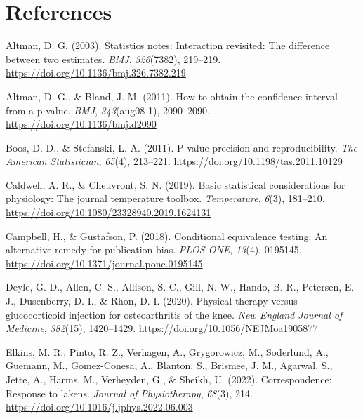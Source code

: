 \documentclass[]{cik}%
\newlength{\cslhangindent}
\newlength{\cslentryspacingunit} %
\newenvironment{CSLReferences}[2] %
 {%
  \setlength{\parindent}{0pt}
  \ifodd #1
  \let\oldpar\par
  \def\par{\hangindent=\cslhangindent\oldpar}
  \fi
  \setlength{\parskip}{#2\cslentryspacingunit}
 }%
 {}
\begin{document}
\newpage

\hypertarget{references}{%
\section*{References}\label{references}}

\hypertarget{refs}{}
\begin{CSLReferences}{1}{0}
\leavevmode{}%
Altman, D. G. (2003). Statistics notes: Interaction revisited: The
difference between two estimates. \emph{BMJ}, \emph{326}(7382),
219--219. \url{https://doi.org/10.1136/bmj.326.7382.219}

\leavevmode{}%
Altman, D. G., \& Bland, J. M. (2011). How to obtain the confidence
interval from a p value. \emph{BMJ}, \emph{343}(aug08 1), 2090--2090.
\url{https://doi.org/10.1136/bmj.d2090}

\leavevmode{}%
Boos, D. D., \& Stefanski, L. A. (2011). P-value precision and
reproducibility. \emph{The American Statistician}, \emph{65}(4),
213--221. \url{https://doi.org/10.1198/tas.2011.10129}

\leavevmode{}%
Caldwell, A. R., \& Cheuvront, S. N. (2019). Basic statistical
considerations for physiology: The journal temperature toolbox.
\emph{Temperature}, \emph{6}(3), 181--210.
\url{https://doi.org/10.1080/23328940.2019.1624131}

\leavevmode{}%
Campbell, H., \& Gustafson, P. (2018). Conditional equivalence testing:
An alternative remedy for publication bias. \emph{PLOS ONE},
\emph{13}(4), 0195145.
\url{https://doi.org/10.1371/journal.pone.0195145}

\leavevmode{}%
Deyle, G. D., Allen, C. S., Allison, S. C., Gill, N. W., Hando, B. R.,
Petersen, E. J., Dusenberry, D. I., \& Rhon, D. I. (2020). Physical
therapy versus glucocorticoid injection for osteoarthritis of the knee.
\emph{New England Journal of Medicine}, \emph{382}(15), 1420--1429.
\url{https://doi.org/10.1056/NEJMoa1905877}

\leavevmode{}%
Elkins, M. R., Pinto, R. Z., Verhagen, A., Grygorowicz, M., Soderlund,
A., Guemann, M., Gomez-Conesa, A., Blanton, S., Brismee, J. M., Agarwal,
S., Jette, A., Harms, M., Verheyden, G., \& Sheikh, U. (2022).
Correspondence: Response to lakens. \emph{Journal of Physiotherapy},
\emph{68}(3), 214. \url{https://doi.org/10.1016/j.jphys.2022.06.003}


\end{CSLReferences}
\end{document}
